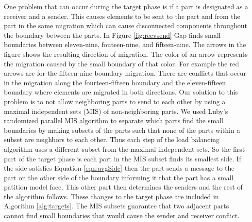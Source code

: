 \documentclass{thesis}
\begin{document}
One problem that can occur during the target phase is if a part is 
designated as a receiver and a sender. This causes elements to be sent 
to the part and from the part in the same migration which can cause 
disconnected components throughout the boundary between the parts. In Figure 
\ref{fig:recvsend} Gap finds small boundaries between  eleven-nine, 
fouteen-nine, and fifteen-nine.
The arrows in the figure shows the resulting direction of migration. The color 
of an arrow represents the migration caused by the small boundary of that color. 
For example the red arrows are for the fifteen-nine boundary migration. There 
are 
conflicts that occur in the migration along the fourteen-fifteen boundary and 
the eleven-fifteen 
boundary where elements are migrated in both directions.  Our solution to this 
problem is to not allow neighboring parts to send to each other by using a 
maximal independent sets (MIS) of non-neighboring parts. We used Luby's 
randomized parallel MIS algorithm \cite{luby} to separate which parts find the 
small boundaries by making subsets of the parts such that none of the parts 
within a subset are neighbors to each other. Thus each step of the load 
balancing algorithm uses a different subset from the maximal independent sets. 
So the first part of the target phase is each part in the MIS subset 
finds its smallest side. If the side satisfies Equation \ref{eqn:avgSide} 
then the part sends a message to the part on the other side of the 
boundary informing it that the part has a small patition model face. This 
other part then 
determines the senders and the rest of the 
algorithm follows. These changes to the target phase are included in Algorithm 
\ref{alg:targets}. The MIS subsets guarantee that two adjacent parts cannot 
find small boundaries that would cause the sender and receiver conflict. 
\end{document}
